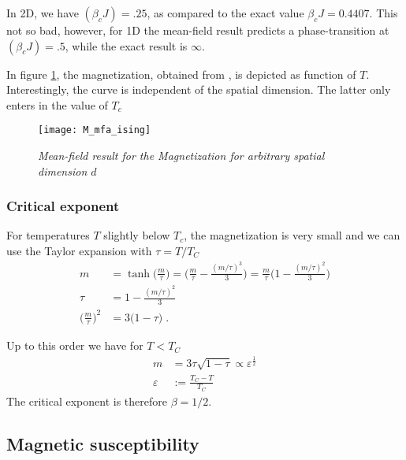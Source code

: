 In 2D, we have $(\beta_{c} J)=.25$, as compared to the exact value $\beta_{c}J=0.4407$.
This not so bad, however, for 1D the mean-field result predicts a phase-transition at $(\beta_{c} J)=.5$, while the exact result is $\infty$.

In figure \ref{fig:M:mfa:ising}, the magnetization, obtained from , is depicted as function of $T$. Interestingly, the curve is independent of the spatial dimension.
The latter only enters in the value of $T_{c}$
\begin{figure}[t]
\begin{center}
\texttt{[image: M\_mfa\_ising]}
\caption{\it Mean-field result for the Magnetization for arbitrary spatial dimension $d$\label{fig:M:mfa:ising}}
\end{center}
\end{figure}

\subsubsection{Critical exponent}
For temperatures $T$ slightly below $T_{c}$, the magnetization is very small and we can use the Taylor expansion with $\tau = T/T_{C}$
\begin{align*}
m &= \tanh\big( \frac{m}{\tau} \big)= \bigg( \frac{m}{\tau} -\frac{(m/\tau)^{3}}{3} \bigg)
= \frac{m}{\tau}\bigg( 1- \frac{(m/\tau)^{2}}{3}\bigg)\\
\tau  &= 1 - \frac{(m/\tau)^{2}}{3}\\
\bigg(\frac{m}{\tau}\bigg)^{2} &= 3 \bigg( 1-\tau\bigg)\;.
\end{align*}

Up to this order we have for $T<T_{C}$
%
\begin{align}\label{eq:ising:mfa:m:Taylor}
m&= 3\tau \sqrt{1- \tau} \propto \varepsilon^{\frac{1}{2}}\\
\varepsilon &:= \frac{T_{C}-T}{T_{C}}
\end{align}
%
The  critical exponent is therefore $\beta=1/2$. 


\subsection{Magnetic susceptibility}


